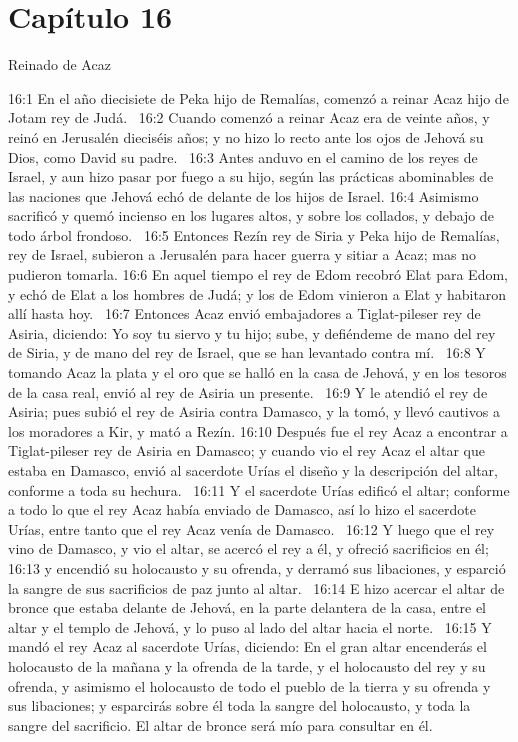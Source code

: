 \section*{Capítulo 16}
Reinado de Acaz  


16:1 En el año diecisiete de Peka hijo de Remalías, comenzó a reinar Acaz hijo de Jotam rey de Judá.  
16:2 Cuando comenzó a reinar Acaz era de veinte años, y reinó en Jerusalén dieciséis años; y no hizo lo recto ante los ojos de Jehová su Dios, como David su padre.  
16:3 Antes anduvo en el camino de los reyes de Israel, y aun hizo pasar por fuego a su hijo, según las prácticas abominables de las naciones que Jehová echó de delante de los hijos de Israel. 
16:4 Asimismo sacrificó y quemó incienso en los lugares altos, y sobre los collados, y debajo de todo árbol frondoso.  
16:5 Entonces Rezín rey de Siria y Peka hijo de Remalías, rey de Israel, subieron a Jerusalén para hacer guerra y sitiar a Acaz; mas no pudieron tomarla. 
16:6 En aquel tiempo el rey de Edom recobró Elat para Edom, y echó de Elat a los hombres de Judá; y los de Edom vinieron a Elat y habitaron allí hasta hoy.  
16:7 Entonces Acaz envió embajadores a Tiglat-pileser rey de Asiria, diciendo: Yo soy tu siervo y tu hijo; sube, y defiéndeme de mano del rey de Siria, y de mano del rey de Israel, que se han levantado contra mí.  
16:8 Y tomando Acaz la plata y el oro que se halló en la casa de Jehová, y en los tesoros de la casa real, envió al rey de Asiria un presente.  
16:9 Y le atendió el rey de Asiria; pues subió el rey de Asiria contra Damasco, y la tomó, y llevó cautivos a los moradores a Kir, y mató a Rezín. 
16:10 Después fue el rey Acaz a encontrar a Tiglat-pileser rey de Asiria en Damasco; y cuando vio el rey Acaz el altar que estaba en Damasco, envió al sacerdote Urías el diseño y la descripción del altar, conforme a toda su hechura.  
16:11 Y el sacerdote Urías edificó el altar; conforme a todo lo que el rey Acaz había enviado de Damasco, así lo hizo el sacerdote Urías, entre tanto que el rey Acaz venía de Damasco.  
16:12 Y luego que el rey vino de Damasco, y vio el altar, se acercó el rey a él, y ofreció sacrificios en él;  
16:13 y encendió su holocausto y su ofrenda, y derramó sus libaciones, y esparció la sangre de sus sacrificios de paz junto al altar.  
16:14 E hizo acercar el altar de bronce que estaba delante de Jehová, en la parte delantera de la casa, entre el altar y el templo de Jehová, y lo puso al lado del altar hacia el norte.  
16:15 Y mandó el rey Acaz al sacerdote Urías, diciendo: En el gran altar encenderás el holocausto de la mañana y la ofrenda de la tarde, y el holocausto del rey y su ofrenda, y asimismo el holocausto de todo el pueblo de la tierra y su ofrenda y sus libaciones; y esparcirás sobre él toda la sangre del holocausto, y toda la sangre del sacrificio. El altar de bronce será mío para consultar en él.  
